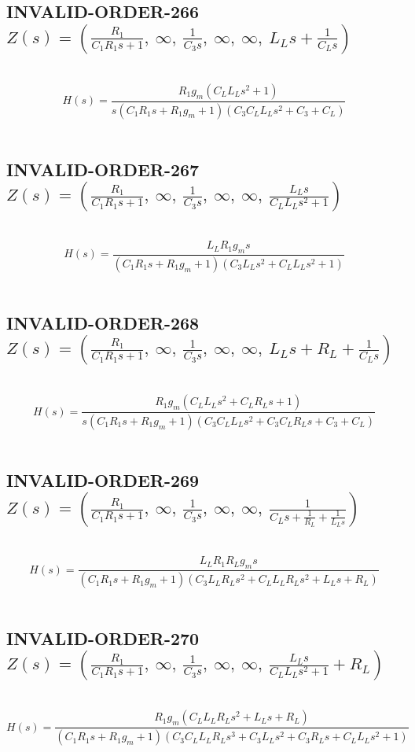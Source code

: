 \documentclass{article}
\begin{document}
\subsection{INVALID-ORDER-266 $Z(s) = \left( \frac{R_{1}}{C_{1} R_{1} s + 1}, \  \infty, \  \frac{1}{C_{3} s}, \  \infty, \  \infty, \  L_{L} s + \frac{1}{C_{L} s}\right)$ } \ 
\textbf{\[H(s) = \frac{R_{1} g_{m} \left(C_{L} L_{L} s^{2} + 1\right)}{s \left(C_{1} R_{1} s + R_{1} g_{m} + 1\right) \left(C_{3} C_{L} L_{L} s^{2} + C_{3} + C_{L}\right)}\] } \ 
\subsection{INVALID-ORDER-267 $Z(s) = \left( \frac{R_{1}}{C_{1} R_{1} s + 1}, \  \infty, \  \frac{1}{C_{3} s}, \  \infty, \  \infty, \  \frac{L_{L} s}{C_{L} L_{L} s^{2} + 1}\right)$ } \ 
\textbf{\[H(s) = \frac{L_{L} R_{1} g_{m} s}{\left(C_{1} R_{1} s + R_{1} g_{m} + 1\right) \left(C_{3} L_{L} s^{2} + C_{L} L_{L} s^{2} + 1\right)}\] } \ 
\subsection{INVALID-ORDER-268 $Z(s) = \left( \frac{R_{1}}{C_{1} R_{1} s + 1}, \  \infty, \  \frac{1}{C_{3} s}, \  \infty, \  \infty, \  L_{L} s + R_{L} + \frac{1}{C_{L} s}\right)$ } \ 
\textbf{\[H(s) = \frac{R_{1} g_{m} \left(C_{L} L_{L} s^{2} + C_{L} R_{L} s + 1\right)}{s \left(C_{1} R_{1} s + R_{1} g_{m} + 1\right) \left(C_{3} C_{L} L_{L} s^{2} + C_{3} C_{L} R_{L} s + C_{3} + C_{L}\right)}\] } \ 
\subsection{INVALID-ORDER-269 $Z(s) = \left( \frac{R_{1}}{C_{1} R_{1} s + 1}, \  \infty, \  \frac{1}{C_{3} s}, \  \infty, \  \infty, \  \frac{1}{C_{L} s + \frac{1}{R_{L}} + \frac{1}{L_{L} s}}\right)$ } \ 
\textbf{\[H(s) = \frac{L_{L} R_{1} R_{L} g_{m} s}{\left(C_{1} R_{1} s + R_{1} g_{m} + 1\right) \left(C_{3} L_{L} R_{L} s^{2} + C_{L} L_{L} R_{L} s^{2} + L_{L} s + R_{L}\right)}\] } \ 
\subsection{INVALID-ORDER-270 $Z(s) = \left( \frac{R_{1}}{C_{1} R_{1} s + 1}, \  \infty, \  \frac{1}{C_{3} s}, \  \infty, \  \infty, \  \frac{L_{L} s}{C_{L} L_{L} s^{2} + 1} + R_{L}\right)$ } \ 
\textbf{\[H(s) = \frac{R_{1} g_{m} \left(C_{L} L_{L} R_{L} s^{2} + L_{L} s + R_{L}\right)}{\left(C_{1} R_{1} s + R_{1} g_{m} + 1\right) \left(C_{3} C_{L} L_{L} R_{L} s^{3} + C_{3} L_{L} s^{2} + C_{3} R_{L} s + C_{L} L_{L} s^{2} + 1\right)}\] } \ 
\end{document}
